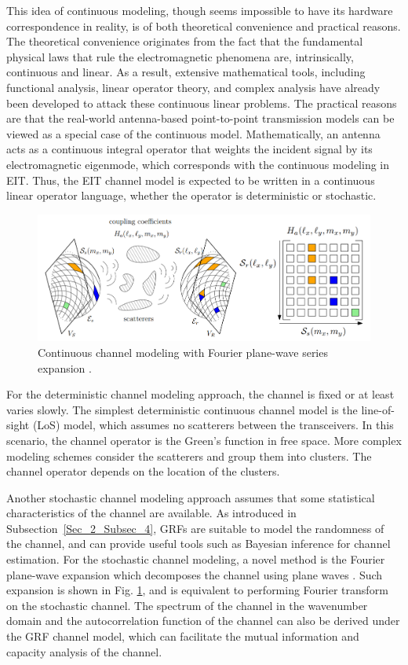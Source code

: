 \documentclass[journal,twocolumn]{IEEEtran}
\begin{document}
This idea of continuous modeling, though seems impossible to have its hardware correspondence in reality, is of both theoretical convenience and practical reasons. 
The theoretical convenience originates from the fact that the fundamental physical laws that rule the electromagnetic phenomena are, intrinsically, continuous and linear. 
As a result, extensive mathematical tools, including functional analysis, linear operator theory, and complex analysis have already been developed to attack these continuous linear problems. 
The practical reasons are that the real-world antenna-based point-to-point transmission models can be viewed as a special case of the continuous model. 
Mathematically, an antenna acts as a continuous integral operator that weights the incident signal by its electromagnetic eigenmode, which corresponds with the continuous modeling in EIT. 
Thus, the EIT channel model is expected to be written in a continuous linear operator language, whether the operator is deterministic or stochastic.
\begin{figure}
	\centering 
	\includegraphics[width=\linewidth]{figures/random_channel.png} 
	\caption{Continuous channel modeling with Fourier plane-wave series expansion \cite{marzetta2022fourier}.} 
	\label{fig:marzetta}
\end{figure}

For the deterministic channel modeling approach, the channel is fixed or at least varies slowly. The simplest deterministic continuous channel model is the line-of-sight (LoS) model, which assumes no scatterers between the transceivers. In this scenario, the channel operator is the Green's function in free space. More complex modeling schemes consider the scatterers and group them into clusters. The channel operator depends on the location of the clusters.

Another stochastic channel modeling approach assumes that some statistical characteristics of the channel are available. As introduced in Subsection~\ref{Sec_2_Subsec_4}, GRFs are suitable to model the randomness of the channel, and can provide useful tools such as Bayesian inference for channel estimation. For the stochastic channel modeling, a novel method is the Fourier plane-wave expansion which decomposes the channel using plane waves \cite{marzetta2022fourier}. Such expansion is shown in Fig. \ref{fig:marzetta}, and is equivalent to performing Fourier transform on the stochastic channel. The spectrum of the channel in the wavenumber domain and the autocorrelation function of the channel can also be derived under the GRF channel model, which can facilitate the mutual information and capacity analysis of the channel.
\end{document}
